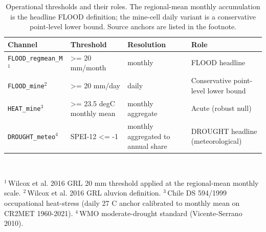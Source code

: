 \begin{table}[H]
\centering
\caption{Operational thresholds and their roles. The regional-mean monthly accumulation is the headline FLOOD definition; the mine-cell daily variant is a conservative point-level lower bound. Source anchors are listed in the footnote.}
\label{tab:thresholds}
\small
\begin{tabular}{p{3.0cm}p{3.8cm}p{2.8cm}p{4.4cm}}
\toprule
\textbf{Channel} & \textbf{Threshold} & \textbf{Resolution} & \textbf{Role} \\
\midrule
\texttt{FLOOD\_regmean\_M}$^{1}$ & >= 20 mm/month & monthly & FLOOD headline \\
\texttt{FLOOD\_mine}$^{2}$ & >= 20 mm/day & daily & Conservative point-level lower bound \\
\texttt{HEAT\_mine}$^{3}$ & >= 23.5 degC monthly mean & monthly aggregate & Acute (robust null) \\
\texttt{DROUGHT\_meteo}$^{4}$ & SPEI-12 <= -1 & monthly aggregated to annual share & DROUGHT headline (meteorological) \\
\bottomrule
\end{tabular}
\\[2pt]
{\footnotesize\raggedright
$^{1}$\,Wilcox et al. 2016 GRL 20 mm threshold applied at the regional-mean monthly scale.\quad
$^{2}$\,Wilcox et al. 2016 GRL aluvion definition.\quad
$^{3}$\,Chile DS 594/1999 occupational heat-stress (daily 27 C anchor calibrated to monthly mean on CR2MET 1960-2021).\quad
$^{4}$\,WMO moderate-drought standard (Vicente-Serrano 2010).
}
\end{table}

